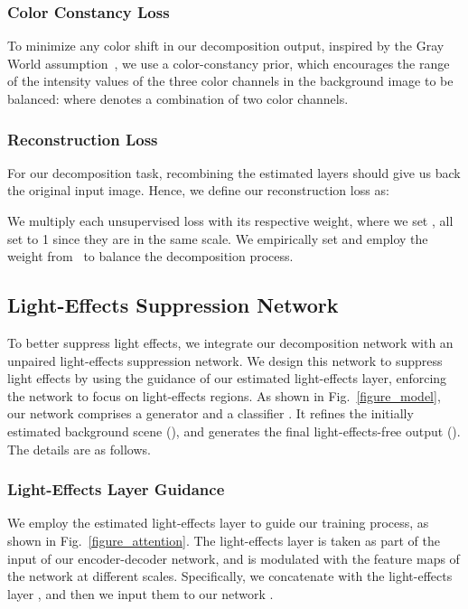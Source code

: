 \documentclass[runningheads]{llncs}
\begin{document}
\subsubsection{Color Constancy Loss}
To minimize any color shift in our decomposition output, inspired by the Gray World  assumption~\cite{buchsbaum1980spatial,guo2020zero,sharma2021nighttime}, we use a color-constancy prior, which encourages the range of the intensity values of the three color channels in the background image  to be balanced:
where  denotes a combination of two color channels.

\subsubsection{Reconstruction Loss}
For our decomposition task, recombining the estimated layers should give us back the original input image.
Hence, we define our reconstruction loss as: 

We multiply each unsupervised loss with its respective weight, where we set ,  all set to 1 since they are in the same scale.
We empirically set  and employ the weight  from~\cite{guo2020zero} to balance the decomposition process.


\subsection{Light-Effects Suppression Network}
To better suppress light effects, we integrate our decomposition network with an unpaired light-effects suppression network. 
We design this network to suppress light effects by using the guidance of our estimated light-effects layer, enforcing the network to focus on light-effects regions.  
As shown in Fig.~\ref{figure_model}, our network comprises a generator  and a classifier .
It refines the initially estimated background scene (), and generates the final light-effects-free output (). 
The details are as follows.

\subsubsection{Light-Effects Layer Guidance}
We employ the estimated light-effects layer  to guide our training process, as shown in Fig.~\ref{figure_attention}.
The light-effects layer is taken as part of the input of our encoder-decoder network, and is modulated with the feature maps of the network at different scales.
Specifically, we concatenate  with the light-effects layer , and then we input them to our network .
\end{document}
